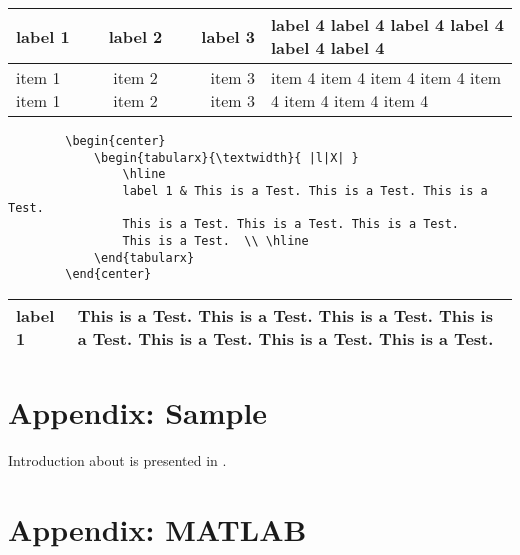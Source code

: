 \bigskip
\begin{center}
	\begin{tabularx}{\textwidth}{ |l|c|r|X| }
		\hline
		label 1 & label 2 & label 3 & label 4 label 4 label 4 label 4 label 4 label 4 \\
		\hline 
		item 1 item 1  & item 2 item 2 & item 3 item 3 & item 4 item 4 item 4 item 4 item 4 item 4 item 4 item 4 \\
		\hline
	\end{tabularx}
\end{center}

\vspace*{2\baselineskip}
\begin{SBN}
	\begin{verbatim}
		\begin{center}
			\begin{tabularx}{\textwidth}{ |l|X| }
				\hline
				label 1 & This is a Test. This is a Test. This is a Test. 
				This is a Test. This is a Test. This is a Test. 
				This is a Test.  \\ \hline
			\end{tabularx}
		\end{center}
	\end{verbatim}
\end{SBN}
\medskip
\begin{center}
	\begin{tabularx}{\textwidth}{ |l|X| }
		\hline
		label 1 & This is a Test. This is a Test. This is a Test. This is a Test. This is a Test. This is a Test. This is a Test.  \\
		\hline
	\end{tabularx}
\end{center}


\np
\appendix
\section{Appendix: Sample} \label{app:sample}
\noindent Introduction about  is presented in . 

\bigskip
\section{Appendix: MATLAB} \label{app:matlab}

